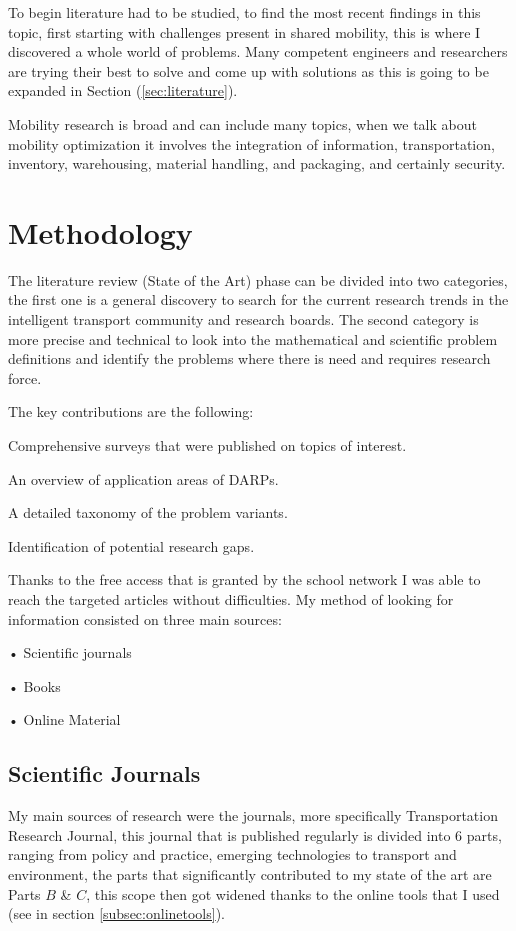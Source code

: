 \documentclass{article}
\begin{document}
To begin literature had to be studied, to find the most recent findings in this topic, first starting with challenges present in shared mobility, this is where I discovered a whole world of problems. Many competent engineers and researchers are trying their best to solve and come up with solutions as this is going to be expanded in Section (\ref{sec:literature}).


Mobility research is broad and can include many topics, when we talk about mobility optimization it  involves the integration of information, transportation, inventory, warehousing, material handling, and packaging, and certainly security.



\section{Methodology}
\label{sec:Methodology}

The literature review (State of the Art) phase can be divided into two categories, the first one is a general discovery to search for the current research trends in the intelligent transport community and research boards. The second category is more precise and technical 
to look into the mathematical and scientific problem definitions and identify the problems where there is need and requires research force.

The key contributions are the following:
\begin{enumerate}{
\item Comprehensive surveys that were published on topics of interest.
\item An overview of application areas of DARPs.
\item A detailed taxonomy of the problem variants.
\item Identification of potential research gaps.}
\end{enumerate}

Thanks to the free access that is granted by the school network I was able to reach the targeted articles without difficulties. My method of looking for information consisted on three main sources:
\begin{list}{}
\item • Scientific journals 
\item • Books
\item • Online Material
\end{list}

\subsection{Scientific Journals}
My main sources of research were the journals, more specifically Transportation Research Journal, this journal that is published regularly is divided into $6$ parts, ranging from policy and practice, emerging technologies to transport and environment, 
the parts that significantly contributed to my state of the art are Parts $B$ \& $C$, this scope then got widened thanks to the online tools that I used (see in section \ref{subsec:onlinetools}). 
\end{document}
